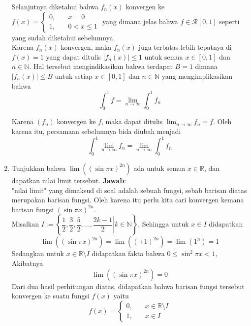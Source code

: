 \documentclass[10pt,openany,a4paper]{article}
\newcommand{\R}{\mathbb{R}}
\newcommand{\N}{\mathbb{N}}
\newcommand{\jawab}{\textbf{Jawab}:}
\begin{document}
\begin{enumerate}
    Selanjutnya diketahui bahwa $f_n(x)$ konvergen ke $f(x)=\begin{cases}
        0,\quad&x=0\\
        1,\quad&0<x\leq 1
    \end{cases}$ yang dimana jelas bahwa $f\in\mathcal{R}[0,1]$ seperti yang sudah diketahui 
    sebelumnya.\\

    Karena $f_n(x)$ konvergen, maka $f_n(x)$ juga terbatas lebih tepatnya di $f(x)=1$ yang dapat
    ditulis $|f_n(x)|\leq 1$ untuk semua $x\in[0,1]$ dan $n\in\N$. Hal tersebut mengindikasikan bahwa terdapat $B=1$ dimana 
    $|f_n(x)|\leq B$ untuk setiap $x\in[0,1]$ dan $n\in\N$ yang mengimplikasikan bahwa
    \[\int_{0}^{1}f=\lim_{n\to\infty}\int_{0}^{1}f_n\]

    Karena $(f_n)$ konvergen ke $f$, maka dapat ditulis $\lim_{n\to\infty}f_n=f$. Oleh karena itu,
    persamaan sebelumnya bida diubah menjadi
    \[\int_{0}^{1}\lim_{n\to\infty}f_n=\lim_{n\to\infty}\int_{0}^{1}f_n\]

    \item Tunjukkan bahwa $\lim((\sin{\pi x})^{2n})$ ada untuk semua $x\in\R$, dan dapatkan 
    nilai limit tersebut.
    \jawab\\
    "nilai limit" yang dimaksud di soal adalah sebuah fungsi, sebab barisan diatas merupakan
    barisan fungsi. Oleh karena itu perlu kita cari konvergen kemana barisan fungsi $(\sin{\pi x})^{2n}$.\\
    Misalkan $I:=\left\{\left.\dfrac{1}{2},\dfrac{3}{2},\dfrac{5}{2},...,\dfrac{2k-1}{2}\right|k\in\N\right\}$, 
    Sehingga untuk $x\in I$ didapatkan
    \[\lim((\sin{\pi x})^{2n})=\lim((\pm 1)^{2n})=\lim(1^n)=1\]
    Sedangkan untuk $x\in\R\setminus I$ didapatkan fakta bahwa $0\leq\sin^2{\pi x}<1$, 
    Akibatnya
    \[\lim((\sin{\pi x})^{2n})=0\]
    Dari dua hasil perhitungan diatas, didapatkan bahwa barisan fungsi tersebut konvergen ke 
    suatu fungsi $f(x)$ yaitu
    \[f(x)=\begin{cases}
        0,\quad& x\in\R\setminus I\\
        1,\quad& x\in I
    \end{cases}\]
\end{enumerate}
\end{document}
